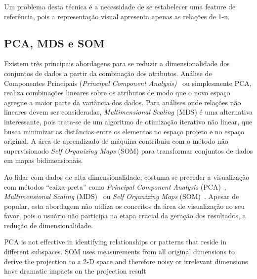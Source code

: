 Um problema desta técnica é a necessidade de se estabelecer uma feature de referência, pois a representação visual apresenta apenas as relações de 1-n.

\subsection{PCA, MDS e SOM}


Existem três principais abordagens para se reduzir a dimensionalidade dos conjuntos de dados a partir da combinação dos atributos. Análise de Componentes Principais (\textit{Principal Component Analysis)}~ ou simplesmente PCA, realiza combinações lineares sobre os atributos de modo que o novo espaço agregue a maior parte da variância dos dados. Para análises onde relações não lineares devem ser consideradas, \textit{Multimensional Scaling} (MDS) é uma alternativa interessante, pois trata-se de um algoritmo de otimização iterativo não linear, que busca minimizar as distâncias entre os elementos no espaço projeto e no espaço original. A área de aprendizado de máquina contribuiu com o método não supervisionado \textit{Self Organizing Maps} (SOM) para transformar conjuntos de dados em mapas bidimensionais.




Ao lidar com dados de alta dimensionalidade, costuma-se preceder a visualização com métodos ``caixa-preta'' como \textit{Principal Component Analysis} (PCA)~\cite{Wold1987},  \textit{Multimensional Scaling} (MDS)~\cite{Mead1992} ou \textit{Self Organizing Maps} (SOM)~\cite{Kohonen1990}. Apesar de popular, esta abordagem não utiliza os conceitos da área de visualização ao seu favor, pois o usuário não participa na etapa crucial da geração dos resultados, a redução de dimensionalidade.

PCA is not effective in identifying relationships or patterns that reside in different subspaces. SOM uses measurements from all original dimensions to derive the projection to a 2-D space and therefore noisy or irrelevant dimensions have dramatic impacts on the projection result

